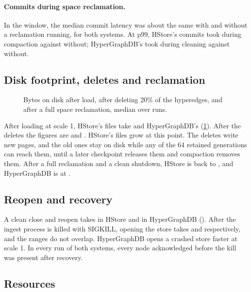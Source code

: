 \paragraph{Commits during space reclamation.} In the  window, the median commit latency was about the same with and without a reclamation running, for both systems. At p99, HStore's commits took  during compaction against  without; HyperGraphDB's took  during cleaning against  without.

\subsection{Disk footprint, deletes and reclamation}

\begin{figure}[t]
\centering

\caption{Bytes on disk after load, after deleting 20\% of the hyperedges, and after a full space reclamation, median over runs.}
\label{fig:disk}
\end{figure}

After loading at scale 1, HStore's files take  and HyperGraphDB's  (\cref{fig:disk}). After the deletes the figures are  and . HStore's files grow at this point. The deletes write new pages, and the old ones stay on disk while any of the 64 retained generations can reach them, until a later checkpoint releases them and compaction removes them. After a full reclamation and a clean shutdown, HStore is back to , and HyperGraphDB is at .

\subsection{Reopen and recovery}

A clean close and reopen takes  in HStore and  in HyperGraphDB (). After the ingest process is killed with SIGKILL, opening the store takes  and  respectively, and the ranges do not overlap. HyperGraphDB opens a crashed store faster at scale 1. In every run of both systems, every node acknowledged before the kill was present after recovery.

\subsection{Resources}
\label{sec:resources}

